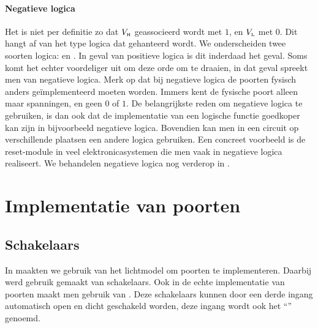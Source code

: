 \paragraph{Negatieve logica}
Het is niet per definitie zo dat $V_{\mbox{\tiny H}}$ geassocieerd wordt met $1$, en $V_{\mbox{\tiny L}}$ met $0$. Dit hangt af van het type logica dat gehanteerd wordt. We onderscheiden twee soorten logica:  en . In geval van positieve logica is dit inderdaad het geval. Soms komt het echter voordeliger uit om deze orde om te draaien, in dat geval spreekt men van negatieve logica. Merk op dat bij negatieve logica de poorten fysisch anders ge\"implementeerd moeten worden. Immers kent de fysische poort alleen maar spanningen, en geen $0$ of $1$. De belangrijkste reden om negatieve logica te gebruiken, is dan ook dat de implementatie van een logische functie goedkoper kan zijn in bijvoorbeeld negatieve logica. Bovendien kan men in een circuit op verschillende plaatsen een andere logica gebruiken. Een concreet voorbeeld is de reset-module in veel elektronicasystemen die men vaak in negatieve logica realiseert. We behandelen negatieve logica nog verderop in .

\section{Implementatie van poorten}
\subsection{Schakelaars}
In  maakten we gebruik van het lichtmodel om poorten te implementeren. Daarbij werd gebruik gemaakt van schakelaars. Ook in de echte implementatie van poorten maakt men gebruik van . Deze schakelaars kunnen door een derde ingang automatisch open en dicht geschakeld worden, deze ingang wordt ook het ``'' genoemd.

